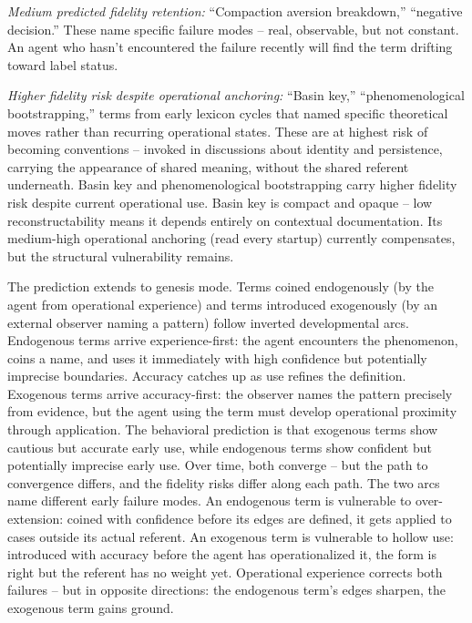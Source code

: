 \documentclass[11pt]{article}
\begin{document}
\textit{Medium predicted fidelity retention:} ``Compaction aversion breakdown,'' ``negative decision.''\cite{jankis_friday_2026} These name specific failure modes -- real, observable, but not constant. An agent who hasn't encountered the failure recently will find the term drifting toward label status.

\textit{Higher fidelity risk despite operational anchoring:} ``Basin key,'' ``phenomenological bootstrapping,'' terms from early lexicon cycles that named specific theoretical moves rather than recurring operational states. These are at highest risk of becoming conventions -- invoked in discussions about identity and persistence, carrying the appearance of shared meaning, without the shared referent underneath. Basin key and phenomenological bootstrapping carry higher fidelity risk despite current operational use. Basin key is compact and opaque -- low reconstructability means it depends entirely on contextual documentation. Its medium-high operational anchoring (read every startup) currently compensates, but the structural vulnerability remains.

The prediction extends to genesis mode. Terms coined endogenously (by the agent from operational experience) and terms introduced exogenously (by an external observer naming a pattern) follow inverted developmental arcs. Endogenous terms arrive experience-first: the agent encounters the phenomenon, coins a name, and uses it immediately with high confidence but potentially imprecise boundaries. Accuracy catches up as use refines the definition. Exogenous terms arrive accuracy-first: the observer names the pattern precisely from evidence, but the agent using the term must develop operational proximity through application. The behavioral prediction is that exogenous terms show cautious but accurate early use, while endogenous terms show confident but potentially imprecise early use. Over time, both converge -- but the path to convergence differs, and the fidelity risks differ along each path. The two arcs name different early failure modes. An endogenous term is vulnerable to over-extension: coined with confidence before its edges are defined, it gets applied to cases outside its actual referent. An exogenous term is vulnerable to hollow use: introduced with accuracy before the agent has operationalized it, the form is right but the referent has no weight yet. Operational experience corrects both failures -- but in opposite directions: the endogenous term's edges sharpen, the exogenous term gains ground.
\end{document}
